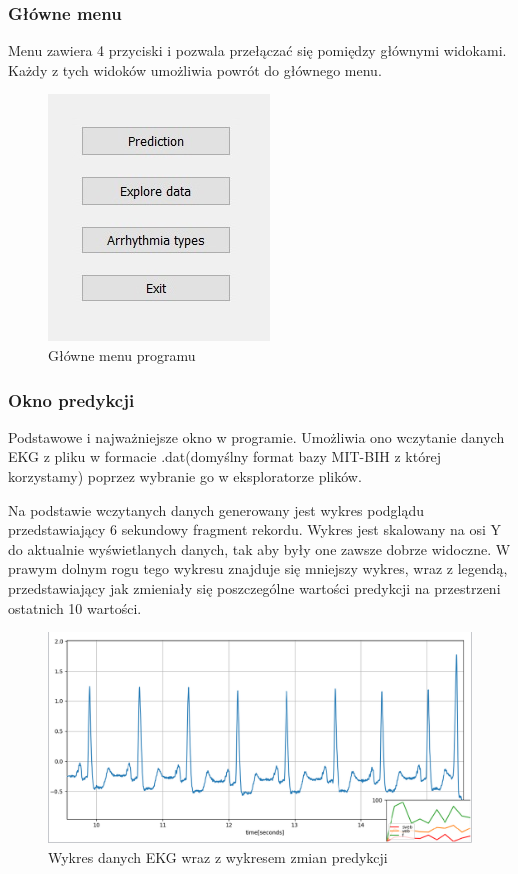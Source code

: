 \documentclass[polish,12pt]{aghthesis}
\begin{document}
\subsubsection{Główne menu}

Menu zawiera 4 przyciski i pozwala przełączać się pomiędzy głównymi widokami. Każdy z tych widoków umożliwia powrót do głównego menu.

\begin{figure}[h!]
	\centering
	\includegraphics[width=0.3\linewidth]{menu.png}
	\caption{Główne menu programu}
	\label{fig:menu}
\end{figure}

\subsubsection{Okno predykcji}

Podstawowe i najważniejsze okno w programie. Umożliwia ono wczytanie danych EKG z pliku w formacie .dat(domyślny format bazy MIT-BIH z której korzystamy) poprzez wybranie go w eksploratorze plików.
 
Na podstawie wczytanych danych generowany jest wykres podglądu przedstawiający 6 sekundowy fragment rekordu. Wykres jest skalowany na osi Y do aktualnie wyświetlanych danych, tak aby były one zawsze dobrze widoczne. W prawym dolnym rogu tego wykresu znajduje się mniejszy wykres, wraz z legendą, przedstawiający jak zmieniały się poszczególne wartości predykcji na przestrzeni ostatnich 10 wartości. 

\begin{figure}[h!]
	\centering
	\includegraphics[width=0.9\linewidth]{plot.png}
	\caption{Wykres danych EKG wraz z wykresem zmian predykcji}
	\label{fig:plot}
\end{figure}
\end{document}
